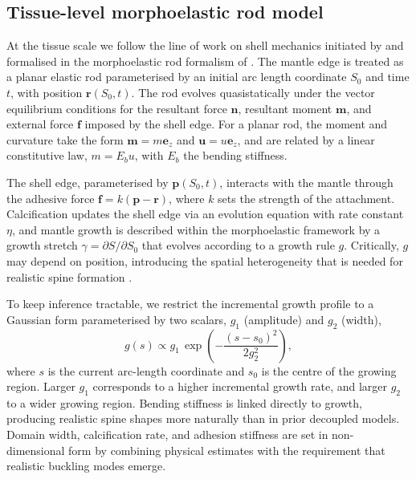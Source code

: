 \documentclass[11pt]{article}
\begin{document}
\subsection{Tissue-level morphoelastic rod model}

At the tissue scale we follow the line of work on shell mechanics initiated
by \citet{chirat2013mechanical} and formalised in the morphoelastic rod
formalism of \citet{moulton2013morphoelastic}. The mantle edge is treated
as a planar elastic rod parameterised by an initial arc length coordinate
$S_0$ and time $t$, with position $\mathbf{r}(S_0, t)$. The rod evolves
quasistatically under the vector equilibrium conditions for the resultant
force $\mathbf{n}$, resultant moment $\mathbf{m}$, and external force
$\mathbf{f}$ imposed by the shell edge. For a planar rod, the moment and
curvature take the form $\mathbf{m} = m \mathbf{e}_z$ and
$\mathbf{u} = u \mathbf{e}_z$, and are related by a linear constitutive
law, $m = E_b u$, with $E_b$ the bending stiffness.

The shell edge, parameterised by $\mathbf{p}(S_0, t)$, interacts with the
mantle through the adhesive force $\mathbf{f} = k(\mathbf{p} - \mathbf{r})$,
where $k$ sets the strength of the attachment. Calcification updates the
shell edge via an evolution equation with rate constant $\eta$, and mantle
growth is described within the morphoelastic framework
\citep{moulton2013morphoelastic,goriely2017mathematics} by a growth stretch
$\gamma = \partial S / \partial S_0$ that evolves according to a growth rule
$g$. Critically, $g$ may depend on position, introducing the spatial
heterogeneity that is needed for realistic spine formation
\citep{chirat2013mechanical}.

To keep inference tractable, we restrict the incremental growth profile to
a Gaussian form parameterised by two scalars,
$g_1$ (amplitude) and $g_2$ (width),
\begin{equation}
g(s) \propto g_1 \, \exp\!\left(-\frac{(s - s_0)^2}{2 g_2^2}\right),
\end{equation}
where $s$ is the current arc-length coordinate and $s_0$ is the centre of
the growing region. Larger $g_1$ corresponds to a higher incremental growth
rate, and larger $g_2$ to a wider growing region. Bending stiffness is
linked directly to growth, producing realistic spine shapes more naturally
than in prior decoupled models. Domain width, calcification rate, and
adhesion stiffness are set in non-dimensional form by combining physical
estimates with the requirement that realistic buckling modes emerge.
\end{document}
